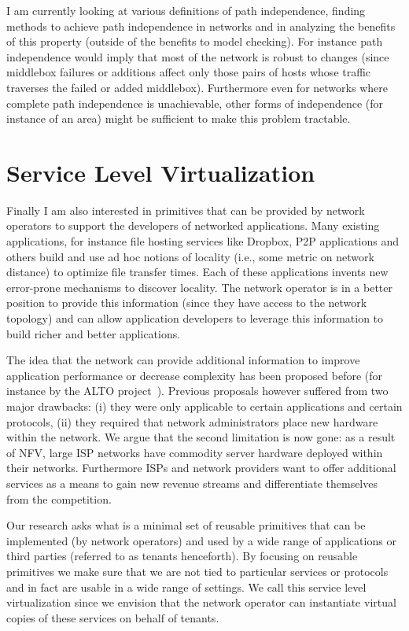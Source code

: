 \documentclass[letterpaper]{article}
\begin{document}
\begin{itemize}
I am currently looking at various definitions of path independence, finding  methods to achieve path
independence in networks and in analyzing the benefits of this property (outside of the benefits to model checking). For
instance path independence would imply that most of the network is robust to changes (since middlebox failures or
additions affect only those pairs of hosts whose traffic traverses the failed or added middlebox). 
Furthermore even for networks where complete path independence is unachievable, other forms of independence (for
instance of an area) might be sufficient to make this problem tractable.


\end{itemize}

\section*{Service Level Virtualization}
Finally I am also interested in primitives that can be provided by network operators to support the developers of
networked applications. Many existing applications, for instance file hosting services like Dropbox, P2P
applications and others build and use ad hoc notions of locality (i.e., some metric on network distance) to optimize
file transfer times. Each of these applications invents new error-prone mechanisms to discover locality. The network
operator is in a better position to provide this information (since they have access to the network topology) and can
allow application developers to leverage this information to build richer and better applications.

The idea that the network can provide additional information to improve application performance or decrease complexity
has been proposed before (for instance by the ALTO project~\cite{seedorf2009traffic}). Previous proposals however
suffered from two major drawbacks: (i) they were only applicable to certain applications and certain protocols, (ii) they
required that network administrators place new hardware within the network. We argue that the second limitation is now
gone: as a result of NFV, large ISP networks have commodity server hardware deployed within
their networks. Furthermore ISPs and network providers want to offer additional services as a means to gain new revenue
streams and differentiate themselves from the competition.

Our research asks what is a minimal set of reusable primitives that can be implemented (by network operators) and used
by a wide range of applications or third parties (referred to as tenants henceforth). By focusing on reusable primitives
we make sure that we are not tied to particular services or protocols and in fact are usable in a wide range of
settings. We call this service level virtualization since we envision that the network operator can instantiate virtual
copies of these services on behalf of tenants.
\end{document}
